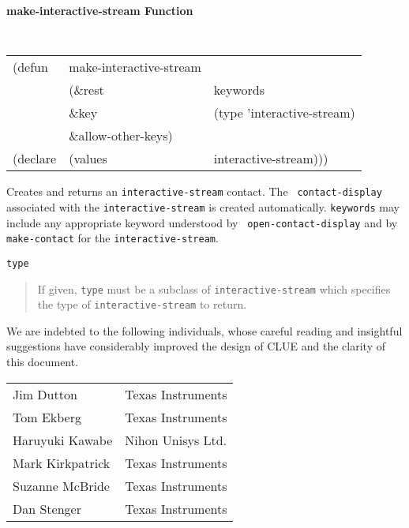 {\samepage
{\large {\bf make-interactive-stream \hfill Function}} 
\begin{flushright} \parbox[t]{6.125in}{
\tt
\begin{tabular}{lll}
\raggedright
(defun & make-interactive-stream & \\ 
& (\&rest & keywords\\
&\&key & (type 'interactive-stream)\\
&\&allow-other-keys) \\
(declare &(values  & interactive-stream))) 
\end{tabular}
\rm

}\end{flushright}}

\begin{flushright} \parbox[t]{6.125in}{
Creates and returns an {\tt interactive-stream} contact. The {\tt
contact-display} associated with the {\tt interactive-stream} is created
automatically. {\tt keywords} may include any appropriate
keyword understood by {\tt
open-contact-display}
and by {\tt make-contact} 
for the {\tt interactive-stream}.

}\end{flushright}


\begin{flushright} \parbox[t]{6.125in}{
{\tt type}
\begin{quote}
If given, {\tt type} must be a subclass of {\tt interactive-stream} which
specifies the type of {\tt interactive-stream} to return.
\end{quote}

}\end{flushright}


We are indebted to the following individuals, whose
careful reading and insightful suggestions have considerably improved the design
of CLUE and the clarity of this document.

\begin{tabular}{ll}
Jim Dutton      &       Texas Instruments \\
Tom Ekberg      &       Texas Instruments \\
Haruyuki Kawabe &       Nihon Unisys Ltd. \\
Mark Kirkpatrick &      Texas Instruments \\
Suzanne McBride &       Texas Instruments \\
Dan Stenger     &       Texas Instruments \\
\end{tabular}

